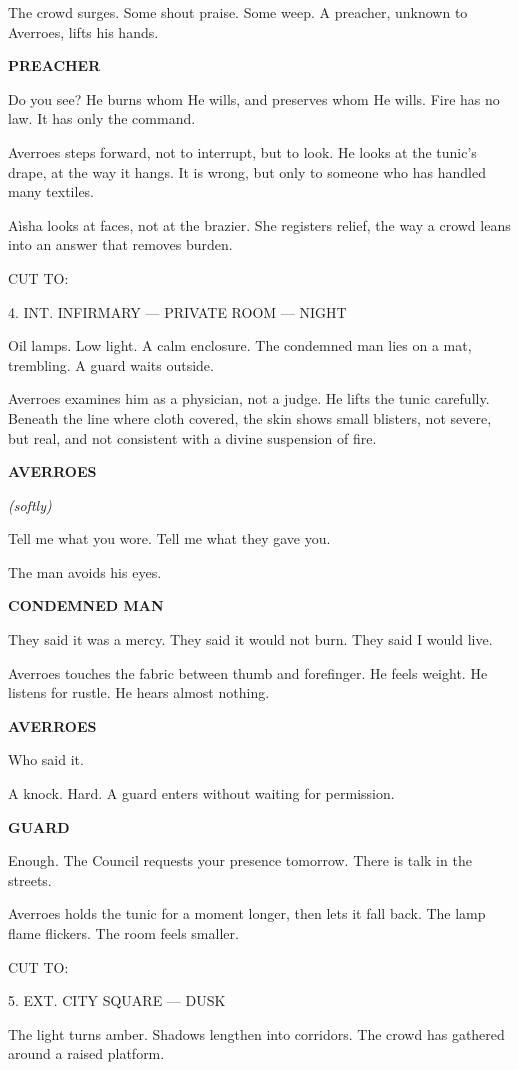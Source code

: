 \documentclass[12pt]{article}
\newlength{\charindent}
\newlength{\dialogueindent}
\newlength{\dialoguewidth}
\newlength{\transitionindent}
\newcommand{\slug}[1]{\vspace{1.25em}\textsc{#1}\vspace{0.5em}}
\newcommand{\action}[1]{#1}
\newcommand{\character}[1]{%
  \par\vspace{0.75em}%
  \hspace*{\charindent}\textbf{#1}%
}
\newcommand{\parenthetical}[1]{%
  \par\nobreak
  \hspace*{\dialogueindent}\textit{(#1)}%
}
\newcommand{\dialogue}[1]{%
  \par\nobreak
  \hspace*{\dialogueindent}%
  \begin{minipage}[t]{\dialoguewidth}
  #1
  \end{minipage}
}
\newcommand{\transition}[1]{%
  \par\vspace{1em}%
  \hspace*{\transitionindent}\textsc{#1}%
}
\begin{document}
\action{The crowd surges. Some shout praise. Some weep. A preacher, unknown to Averroes, lifts his hands.}

\character{PREACHER}
\dialogue{Do you see? He burns whom He wills, and preserves whom He wills. Fire has no law. It has only the command.}

\action{Averroes steps forward, not to interrupt, but to look. He looks at the tunic's drape, at the way it hangs. It is wrong, but only to someone who has handled many textiles.}

\action{A\`isha looks at faces, not at the brazier. She registers relief, the way a crowd leans into an answer that removes burden.}

\transition{CUT TO:}

\slug{4. INT. INFIRMARY --- PRIVATE ROOM --- NIGHT}

\action{Oil lamps. Low light. A calm enclosure. The condemned man lies on a mat, trembling. A guard waits outside.}

\action{Averroes examines him as a physician, not a judge. He lifts the tunic carefully. Beneath the line where cloth covered, the skin shows small blisters, not severe, but real, and not consistent with a divine suspension of fire.}

\character{AVERROES}
\parenthetical{softly}
\dialogue{Tell me what you wore. Tell me what they gave you.}

\action{The man avoids his eyes.}

\character{CONDEMNED MAN}
\dialogue{They said it was a mercy. They said it would not burn. They said I would live.}

\action{Averroes touches the fabric between thumb and forefinger. He feels weight. He listens for rustle. He hears almost nothing.}

\character{AVERROES}
\dialogue{Who said it.}

\action{A knock. Hard. A guard enters without waiting for permission.}

\character{GUARD}
\dialogue{Enough. The Council requests your presence tomorrow. There is talk in the streets.}

\action{Averroes holds the tunic for a moment longer, then lets it fall back. The lamp flame flickers. The room feels smaller.}

\transition{CUT TO:}

\slug{5. EXT. CITY SQUARE --- DUSK}

\action{The light turns amber. Shadows lengthen into corridors. The crowd has gathered around a raised platform.}
\end{document}
